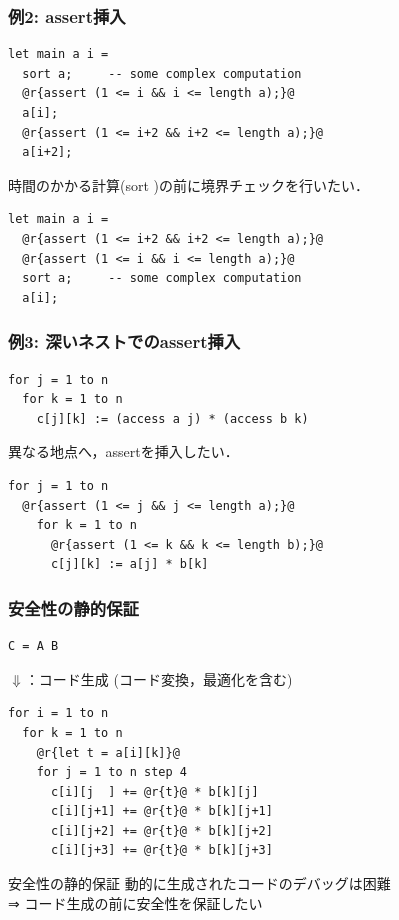 \documentclass[dvipdfmx,cjk,xcolor=dvipsnames,envcountsect,notheorems,12pt]{beamer}
\theoremstyle{definition}
\begin{document}
\begin{frame}[fragile]
  \frametitle{例2: assert挿入}
\begin{lstlisting}
let main a i =
  sort a;     -- some complex computation
  @r{assert (1 <= i && i <= length a);}@
  a[i];
  @r{assert (1 <= i+2 && i+2 <= length a);}@
  a[i+2];
\end{lstlisting}
  \pause
  時間のかかる計算(sort )の前に境界チェックを行いたい．
\begin{lstlisting}
let main a i =
  @r{assert (1 <= i+2 && i+2 <= length a);}@
  @r{assert (1 <= i && i <= length a);}@
  sort a;     -- some complex computation
  a[i];
\end{lstlisting}

\end{frame}

\begin{frame}[fragile]
  \frametitle{例3: 深いネストでのassert挿入}

\begin{lstlisting}
for j = 1 to n
  for k = 1 to n
    c[j][k] := (access a j) * (access b k)
\end{lstlisting}
  \pause
  異なる地点へ，assertを挿入したい．
\begin{lstlisting}
for j = 1 to n
  @r{assert (1 <= j && j <= length a);}@
    for k = 1 to n
      @r{assert (1 <= k && k <= length b);}@
      c[j][k] := a[j] * b[k]
\end{lstlisting}

\end{frame}

\begin{frame}[fragile]
  \frametitle{安全性の静的保証}
\begin{lstlisting}
C = A B
\end{lstlisting}
  \begin{center}
    $\Downarrow$：コード生成 (コード変換，最適化を含む)
  \end{center}
\begin{lstlisting}
for i = 1 to n
  for k = 1 to n
    @r{let t = a[i][k]}@
    for j = 1 to n step 4
      c[i][j  ] += @r{t}@ * b[k][j]
      c[i][j+1] += @r{t}@ * b[k][j+1]
      c[i][j+2] += @r{t}@ * b[k][j+2]
      c[i][j+3] += @r{t}@ * b[k][j+3]
\end{lstlisting}

  \begin{exampleblock}{安全性の静的保証}
    動的に生成されたコードのデバッグは困難\\
    ⇒ コード生成の前に安全性を保証したい
  \end{exampleblock}

\end{frame}
\end{document}
